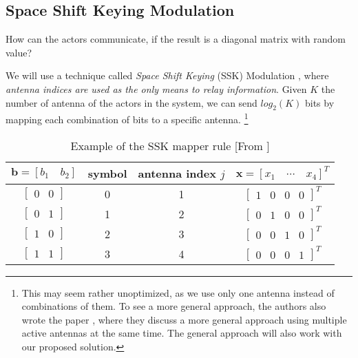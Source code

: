 \subsection{Space Shift Keying Modulation
}

How can the actors communicate, if the result is a diagonal matrix with random value?

We will use a technique called \textit{Space Shift Keying} (SSK) Modulation \cite{5165332}, where \textit{antenna indices are used as the only means to relay information}. Given $K$ the number of antenna of the actors in the system, we can send $log_2(K)$ bits by mapping each combination of bits to a specific antenna.
\footnote{This may seem rather unoptimized, as we use only one antenna instead of combinations of them. To see a more general approach, the authors also wrote the paper \cite{4699782}, where they discuss a more general approach using multiple active antennas at the same time. The general approach will also work with our proposed solution.}


\begin{table}[H]
  \centering
  \caption{Example of the SSK mapper rule [From \cite{5165332}]}
  \label{tab:ssk_mapper}
  \begin{tabular}{c|c|c|c}
    $\mathbf{b} = [b_1 \quad b_2]$        & symbol & antenna index $j$ & $\mathbf{x} = [x_1 \quad \cdots \quad x_4]^T$   \\
    \hline
    $\begin{bmatrix} 0 & 0 \end{bmatrix}$ & 0      & 1                 & $\begin{bmatrix} 1 & 0 & 0 & 0 \end{bmatrix}^T$ \\
    $\begin{bmatrix} 0 & 1 \end{bmatrix}$ & 1      & 2                 & $\begin{bmatrix} 0 & 1 & 0 & 0 \end{bmatrix}^T$ \\
    $\begin{bmatrix} 1 & 0 \end{bmatrix}$ & 2      & 3                 & $\begin{bmatrix} 0 & 0 & 1 & 0 \end{bmatrix}^T$ \\
    $\begin{bmatrix} 1 & 1 \end{bmatrix}$ & 3      & 4                 & $\begin{bmatrix} 0 & 0 & 0 & 1 \end{bmatrix}^T$ \\
  \end{tabular}
\end{table}

